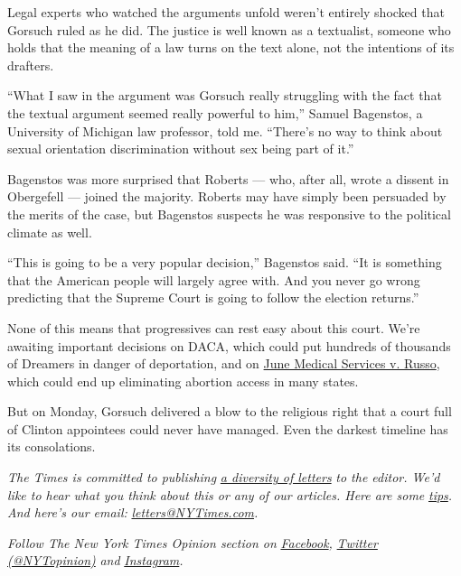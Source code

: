 Legal experts who watched the arguments unfold weren't entirely shocked
that Gorsuch ruled as he did. The justice is well known as a textualist,
someone who holds that the meaning of a law turns on the text alone, not
the intentions of its drafters.

``What I saw in the argument was Gorsuch really struggling with the fact
that the textual argument seemed really powerful to him,'' Samuel
Bagenstos, a University of Michigan law professor, told me. ``There's no
way to think about sexual orientation discrimination without sex being
part of it.''

Bagenstos was more surprised that Roberts --- who, after all, wrote a
dissent in Obergefell --- joined the majority. Roberts may have simply
been persuaded by the merits of the case, but Bagenstos suspects he was
responsive to the political climate as well.

``This is going to be a very popular decision,'' Bagenstos said. ``It is
something that the American people will largely agree with. And you
never go wrong predicting that the Supreme Court is going to follow the
election returns.''

None of this means that progressives can rest easy about this court.
We're awaiting important decisions on DACA, which could put hundreds of
thousands of Dreamers in danger of deportation, and on
\href{https://www.nytimes3xbfgragh.onion/2020/06/29/us/supreme-court-abortion-louisiana.html}{June
Medical Services v. Russo}, which could end up eliminating abortion
access in many states.

But on Monday, Gorsuch delivered a blow to the religious right that a
court full of Clinton appointees could never have managed. Even the
darkest timeline has its consolations.

\emph{The Times is committed to publishing}
\href{https://www.nytimes3xbfgragh.onion/2019/01/31/opinion/letters/letters-to-editor-new-york-times-women.html}{\emph{a
diversity of letters}} \emph{to the editor. We'd like to hear what you
think about this or any of our articles. Here are some}
\href{https://help.nytimes3xbfgragh.onion/hc/en-us/articles/115014925288-How-to-submit-a-letter-to-the-editor}{\emph{tips}}\emph{.
And here's our email:}
\href{mailto:letters@NYTimes.com}{\emph{letters@NYTimes.com}}\emph{.}

\emph{Follow The New York Times Opinion section on}
\href{https://www.facebookcorewwwi.onion/nytopinion}{\emph{Facebook}}\emph{,}
\href{http://twitter.com/NYTOpinion}{\emph{Twitter (@NYTopinion)}}
\emph{and}
\href{https://www.instagram.com/nytopinion/}{\emph{Instagram}}\emph{.}

